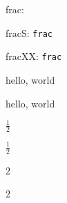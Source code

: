 \documentclass{amsart}
\begin{document}
frac: {\tt\meaning\frac}

fracS: {\tt\expandafter\meaning\csname frac\space\endcsname}

fracXX: {\tt\expandafter\meaning\csname frac\space\space\endcsname}

\lowercase{HELLO, WORLD}

hello, world

$\frac 1 2$

$\tfrac 1 2$

 2

 2
\end{document}
